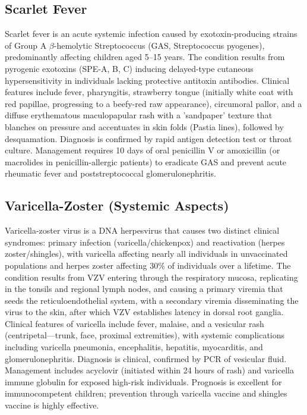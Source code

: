 \subsection{Scarlet Fever}
\label{sec:Scarlet Fever}
Scarlet fever is an acute systemic infection caused by exotoxin-producing strains of Group A $\beta$-hemolytic Streptococcus (GAS, Streptococcus pyogenes), predominantly affecting children aged 5--15 years. The condition results from pyrogenic exotoxins (SPE-A, B, C) inducing delayed-type cutaneous hypersensitivity in individuals lacking protective antitoxin antibodies. Clinical features include fever, pharyngitis, strawberry tongue (initially white coat with red papillae, progressing to a beefy-red raw appearance), circumoral pallor, and a diffuse erythematous maculopapular rash with a 'sandpaper' texture that blanches on pressure and accentuates in skin folds (Pastia lines), followed by desquamation. Diagnosis is confirmed by rapid antigen detection test or throat culture. Management requires 10 days of oral penicillin V or amoxicillin (or macrolides in penicillin-allergic patients) to eradicate GAS and prevent acute rheumatic fever and poststreptococcal glomerulonephritis.

\subsection{Varicella-Zoster (Systemic Aspects)}
\label{sec:Varicella-Zoster Systemic}
Varicella-zoster virus is a DNA herpesvirus that causes two distinct clinical syndromes: primary infection (varicella/chickenpox) and reactivation (herpes zoster/shingles), with varicella affecting nearly all individuals in unvaccinated populations and herpes zoster affecting 30\% of individuals over a lifetime. The condition results from VZV entering through the respiratory mucosa, replicating in the tonsils and regional lymph nodes, and causing a primary viremia that seeds the reticuloendothelial system, with a secondary viremia disseminating the virus to the skin, after which VZV establishes latency in dorsal root ganglia. Clinical features of varicella include fever, malaise, and a vesicular rash (centripetal---trunk, face, proximal extremities), with systemic complications including varicella pneumonia, encephalitis, hepatitis, myocarditis, and glomerulonephritis. Diagnosis is clinical, confirmed by PCR of vesicular fluid. Management includes acyclovir (initiated within 24 hours of rash) and varicella immune globulin for exposed high-risk individuals. Prognosis is excellent for immunocompetent children; prevention through varicella vaccine and shingles vaccine is highly effective.

